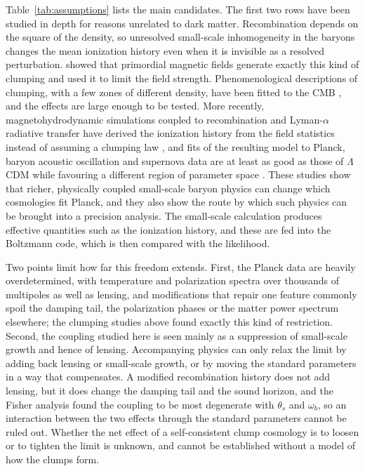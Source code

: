 \documentclass[11pt,a4paper]{article}
\begin{document}
Table~\ref{tab:assumptions} lists the main candidates. The first two rows have been studied in depth for reasons unrelated to dark matter. Recombination depends on the square of the density, so unresolved small-scale inhomogeneity in the baryons changes the mean ionization history even when it is invisible as a resolved perturbation. \citet{JedamzikSaveliev2019} showed that primordial magnetic fields generate exactly this kind of clumping and used it to limit the field strength. Phenomenological descriptions of clumping, with a few zones of different density, have been fitted to the CMB \citep{Rashkovetskyi2021,Thiele2021}, and the effects are large enough to be tested. More recently, magnetohydrodynamic simulations coupled to recombination and Lyman-$\alpha$ radiative transfer have derived the ionization history from the field statistics instead of assuming a clumping law \citep{Jedamzik2023}, and fits of the resulting model to Planck, baryon acoustic oscillation and supernova data are at least as good as those of $\Lambda$CDM while favouring a different region of parameter space \citep{Jedamzik2025}. These studies show that richer, physically coupled small-scale baryon physics can change which cosmologies fit Planck, and they also show the route by which such physics can be brought into a precision analysis. The small-scale calculation produces effective quantities such as the ionization history, and these are fed into the Boltzmann code, which is then compared with the likelihood.

Two points limit how far this freedom extends. First, the Planck data are heavily overdetermined, with temperature and polarization spectra over thousands of multipoles as well as lensing, and modifications that repair one feature commonly spoil the damping tail, the polarization phases or the matter power spectrum elsewhere; the clumping studies above found exactly this kind of restriction. Second, the coupling studied here is seen mainly as a suppression of small-scale growth and hence of lensing. Accompanying physics can only relax the limit by adding back lensing or small-scale growth, or by moving the standard parameters in a way that compensates. A modified recombination history does not add lensing, but it does change the damping tail and the sound horizon, and the Fisher analysis found the coupling to be most degenerate with $\theta_s$ and $\omega_b$, so an interaction between the two effects through the standard parameters cannot be ruled out. Whether the net effect of a self-consistent clump cosmology is to loosen or to tighten the limit is unknown, and cannot be established without a model of how the clumps form.
\end{document}
